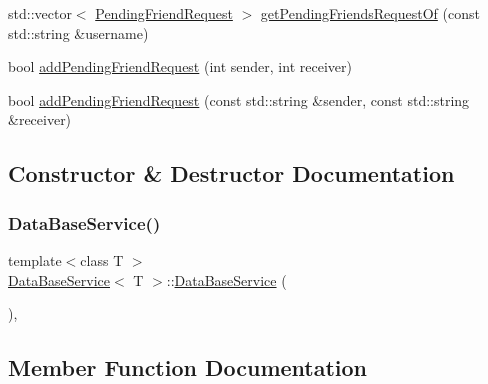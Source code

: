 \begin{DoxyCompactItemize}
\item 
std\+::vector$<$ \mbox{\hyperlink{structPendingFriendRequest}{Pending\+Friend\+Request}} $>$ \mbox{\hyperlink{classDataBaseService_a96fb5a08a7337b7c2728317d445fc923}{get\+Pending\+Friends\+Request\+Of}} (const std\+::string \&username)
\item 
bool \mbox{\hyperlink{classDataBaseService_a1f31c3e831b50028eccfe4bbc6fce6cd}{add\+Pending\+Friend\+Request}} (int sender, int receiver)
\item 
bool \mbox{\hyperlink{classDataBaseService_a655fd576cba8952f982546adacaa6e57}{add\+Pending\+Friend\+Request}} (const std\+::string \&sender, const std\+::string \&receiver)
\end{DoxyCompactItemize}


\subsection{Constructor \& Destructor Documentation}
\mbox{\label{classDataBaseService_ac5820e66451a0393723eb87db0c98c97}} 
\subsubsection{\texorpdfstring{Data\+Base\+Service()}{DataBaseService()}}
{\footnotesize\ttfamily template$<$class T $>$ \\
\mbox{\hyperlink{classDataBaseService}{Data\+Base\+Service}}$<$ T $>$\+::\mbox{\hyperlink{classDataBaseService}{Data\+Base\+Service}} (\begin{DoxyParamCaption}{ }\end{DoxyParamCaption})\hspace{0.3cm}{\ttfamily [inline]}, {\ttfamily [explicit]}}



\subsection{Member Function Documentation}
\mbox{\label{classDataBaseService_a1f31c3e831b50028eccfe4bbc6fce6cd}} 
